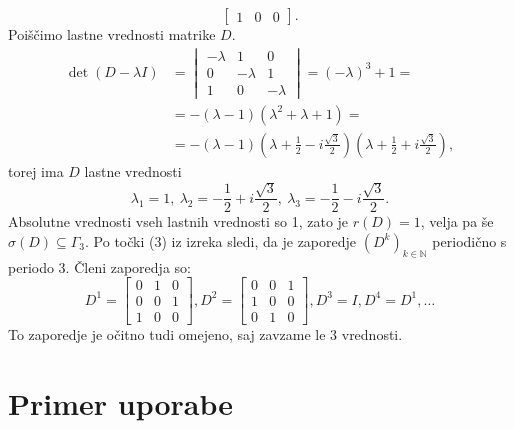 \documentclass[mat1]{fmfdelo}
\newcommand{\N}{\mathbb N}
\begin{document}
\begin{zgled}
\begin{enumerate}
\begin{equation*}
\begin{bmatrix}
                1 & 0 & 0
            \end{bmatrix}.
        \end{equation*}
        Poiščimo lastne vrednosti matrike $D$.
        \begin{align*}
            \det (D - \lambda I) &=
            \begin{vmatrix}
                -\lambda & 1 & 0 \\
                0 & -\lambda & 1 \\
                1 & 0 & -\lambda
            \end{vmatrix}
            = (-\lambda)^3 + 1 = \\
            &= -(\lambda - 1)(\lambda^2+\lambda+1) = \\
            &= -(\lambda - 1)(\lambda + \frac{1}{2} - i\frac{\sqrt{3}}{2})(\lambda + \frac{1}{2} + i\frac{\sqrt{3}}{2}),
        \end{align*}
        torej ima $D$ lastne vrednosti \[\lambda_1=1,\ \lambda_2 = - \frac{1}{2} + i\frac{\sqrt{3}}{2},\ \lambda_3 = - \frac{1}{2} - i\frac{\sqrt{3}}{2}.\] Absolutne vrednosti vseh lastnih vrednosti so 1, zato je $r(D) = 1$, velja pa še $\sigma(D) \subseteq \Gamma_3$. Po točki (3) iz izreka sledi, da je zaporedje $(D^k)_{k\in\N}$ periodično s periodo 3. Členi zaporedja so:
        \begin{equation*}
            D^1 =
            \begin{bmatrix}
                0 & 1 & 0 \\
                0 & 0 & 1 \\
                1 & 0 & 0
            \end{bmatrix},
            D^2 = 
            \begin{bmatrix}
                0 & 0 & 1 \\
                1 & 0 & 0 \\
                0 & 1 & 0
            \end{bmatrix},
            D^3 = I, D^4 = D^1, \ldots
        \end{equation*}
        To zaporedje je očitno tudi omejeno, saj zavzame le 3 vrednosti.
    \end{enumerate}
\end{zgled}

\section{Primer uporabe}
\end{document}
